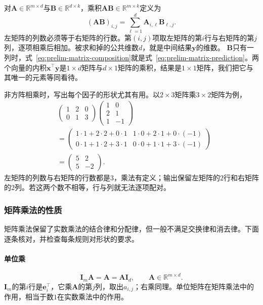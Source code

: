 对$\bm A\in\mathbb R^{m\times d}$与$\bm B\in\mathbb R^{d\times k}$，乘积$\bm A\bm B\in\mathbb R^{m\times k}$定义为
\begin{equation}
 (\bm A\bm B)_{i,j}=\sum_{\ell=1}^d\bm A_{i,\ell}\bm B_{\ell,j}.
 \label{eq:prelim-matrix-composition}
\end{equation}
左矩阵的列数必须等于右矩阵的行数。第$(i,j)$项取左矩阵的第$i$行与右矩阵的第$j$列，逐项相乘后相加。被求和掉的公共维数$d$，就是中间结果$\bm y$的维数。
$\bm B$只有一列时，式~\eqref{eq:prelim-matrix-composition}就是式~\eqref{eq:prelim-matrix-prediction}。两个向量的内积$\bm x^\top\bm y$是$1\times d$矩阵与$d\times1$矩阵的乘积，结果是$1\times1$矩阵，我们把它与其唯一的元素等同看待。

非方阵相乘时，写出每个因子的形状尤其有用。以$2\times3$矩阵乘$3\times2$矩阵为例，
\[
 \begin{aligned}
 &\begin{pmatrix}1&2&0\\0&1&3\end{pmatrix}
 \begin{pmatrix}1&0\\2&1\\1&-1\end{pmatrix}\\
 &=\begin{pmatrix}1\cdot1+2\cdot2+0\cdot1&1\cdot0+2\cdot1+0\cdot(-1)\\
 0\cdot1+1\cdot2+3\cdot1&0\cdot0+1\cdot1+3\cdot(-1)\end{pmatrix}\\
 &=\begin{pmatrix}5&2\\5&-2\end{pmatrix}.
 \end{aligned}
\]
左矩阵的列数与右矩阵的行数都是$3$，乘法有定义；输出保留左矩阵的$2$行和右矩阵的$2$列。若这两个数不相等，行与列就无法逐项配对。

\subsubsection{矩阵乘法的性质}
\label{sec:ls-matrix-operation-properties}

矩阵乘法保留了实数乘法的结合律和分配律，但一般不满足交换律和消去律。下面逐条核对，并检查每条规则对形状的要求。

\paragraph{单位乘}
\[
\bm I_m\bm A=\bm A=\bm A\bm I_d,\qquad
\bm A\in\mathbb R^{m\times d}.
\]
$\bm I_m$的第$i$行是$\bm e_i^\top$，它乘$\bm A$的第$j$列，取出$a_{i,j}$；右乘同理。单位矩阵在矩阵乘法中的作用，相当于数$1$在实数乘法中的作用。


